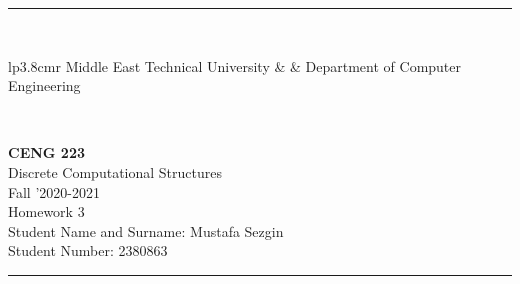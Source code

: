 \documentclass[12pt]{article}
\newcommand{\HRule}{\rule{\linewidth}{1mm}}
\begin{document}
\noindent
\HRule \\[3mm]
\small
\begin{tabular}[b]{lp{3.8cm}r}
{} Middle East Technical University &  &
{} Department of Computer Engineering \\
\end{tabular} \\
\begin{center}

                 \LARGE \textbf{CENG 223} \\[4mm]
                 \Large Discrete Computational Structures \\[4mm]
                \normalsize Fall '2020-2021 \\
                    \Large Homework 3 \\
                \normalsize Student Name and Surname: Mustafa Sezgin  \\
                \normalsize Student Number: 2380863 \\
\end{center}
\HRule
\end{document}
